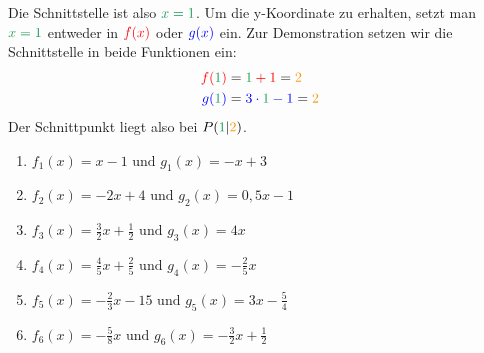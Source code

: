 Die Schnittstelle ist also \(\textcolor{ForestGreen}{x=1}\). Um die y-Koordinate zu erhalten, setzt man \(\textcolor{ForestGreen}{x=1}\) entweder in \(\textcolor{red}{f(x)}\) oder \(\textcolor{blue}{g(x)}\) ein. Zur Demonstration setzen wir die Schnittstelle in beide Funktionen ein:
\begin{align*}
	\textcolor{red}{f(}\textcolor{ForestGreen}{1}\textcolor{red}{)}&=\textcolor{red}{\textcolor{ForestGreen}{1}+1}=\textcolor{YellowOrange}{2}\\
	\textcolor{blue}{g(}\textcolor{ForestGreen}{1}\textcolor{blue}{)}&=\textcolor{blue}{3\cdot \textcolor{ForestGreen}{1}-1}=\textcolor{YellowOrange}{2}
\end{align*}
Der Schnittpunkt liegt also bei \(P\left(\textcolor{ForestGreen}{1}\middle\vert\textcolor{YellowOrange}{2}\right)\).
\begin{Exercise}[title={Bestimme jeweils den Schnittpunkt}, label=schnittpunktA1]
	
	\begin{minipage}{0.5\textwidth}
		\begin{enumerate}[label=\alph*)]
			\item \(f_1(x)=x-1\text{ und }g_1(x)=-x+3\)
			\item \(f_2(x)=-2x+4\text{ und }g_2(x)=0,5x-1\)
			\item \(f_3(x)=\frac{3}{2}x+\frac{1}{2}\text{ und }g_3(x)=4x\)
		\end{enumerate}
	\end{minipage}%
	\begin{minipage}{0.5\textwidth}
		\begin{enumerate}[label=\alph*)]
			\setcounter{enumi}{3}
			\item \(f_4(x)=\frac{4}{5}x+\frac{2}{5}\text{ und }g_4(x)=-\frac{2}{5}x\)
			\item \(f_5(x)=-\frac{2}{3}x-15\text{ und }g_5(x)=3x-\frac{5}{4}\)
			\item \(f_6(x)=-\frac{5}{8}x\text{ und }g_6(x)=-\frac{3}{2}x+\frac{1}{2}\)
		\end{enumerate}
	\end{minipage}%
\end{Exercise}\vspace{.5cm}
